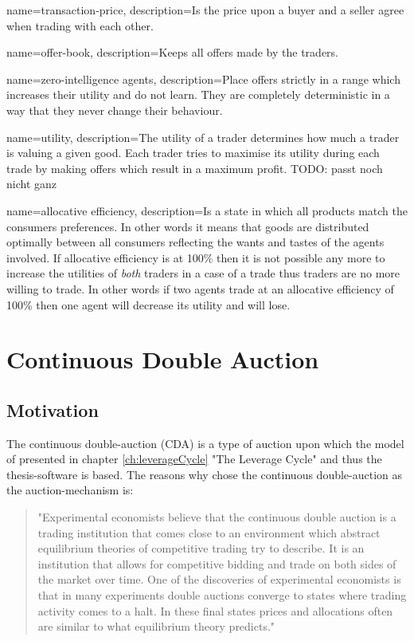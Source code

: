 \documentclass[../Bachelorarbeit.tex]{subfiles}
\begin{document}
 {
	name=transaction-price,
	description={Is the price upon a buyer and a seller agree when trading with each other.}
}

 {
	name=offer-book,
	description={Keeps all offers made by the traders.}
}

 {
	name=zero-intelligence agents,
	description={Place offers strictly in a range which increases their utility and do not learn. They are completely deterministic in a way that they never change their behaviour.}
}

 {
	name=utility,
	description={The utility of a trader determines how much a trader is valuing a given good. Each trader tries to maximise its utility during each trade by making offers which result in a maximum profit. TODO: passt noch nicht ganz}
}

 {
	name=allocative efficiency,
	description={Is a state in which all products match the consumers preferences. In other words it means that goods are distributed optimally between all consumers reflecting the wants and tastes of the agents involved. If allocative efficiency is at 100\% then it is not possible any more to increase the utilities of \textit{both} traders in a case of a trade thus traders are no more willing to trade. In other words if two agents trade at an allocative efficiency of 100\% then one agent will decrease its utility and will lose.}
}

\section{Continuous Double Auction}	

\subsection{Motivation}
The continuous double-auction (CDA) is a type of auction upon which the model of \cite{Breuer2015} presented in chapter \ref{ch:leverageCycle} "The Leverage Cycle" and thus the thesis-software is based. The reasons why \cite{Breuer2015} chose the continuous double-auction as the auction-mechanism is:

\begin{quote}
"Experimental economists believe that the continuous double auction is a trading institution that comes close to an environment which abstract equilibrium theories of competitive trading try to describe. It is an institution that allows for competitive bidding and trade on both sides of the market over time. One of the discoveries of experimental economists is that in many experiments double auctions converge to states where trading activity comes to a halt. In these final states prices and allocations often are similar to what equilibrium theory predicts."
\end{quote}
\end{document}
